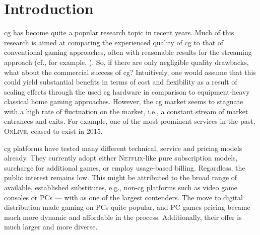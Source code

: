 
\section{Introduction}

\Gls{cg} has become quite a popular research topic in recent years.
Much of this research is aimed at comparing the experienced quality of
\gls{cg} to that of conventional gaming approaches, often with
reasonable results for the streaming approach (cf., for example,
\cite{5976180}). So, if there are only negligible quality drawbacks,
what about the commercial success of \gls{cg}? Intuitively, one
would assume that this could yield substantial benefits in terms of cost
and flexibility as a result of scaling effects through the used
\gls{cg} hardware in comparison to equipment-heavy classical home gaming
approaches. However, the \gls{cg} market seems to stagnate with a
high rate of fluctuation on the market, i.e., a constant stream of
market entrances and exits. For example, one of the most prominent
services in the past, \textsc{OnLive}, ceased to exist in 2015.




\Gls{cg} platforms have tested many different technical, service
and pricing models already. They currently adopt either
\textsc{Netflix}-like pure subscription models, surcharge for
additional games, or employ usage-based billing. Regardless, the public
interest remains low. This might be attributed to the broad range of
available, established substitutes, e.g., non-\gls{cg} platforms
such as video game consoles or PCs ---
with \steam{} as one of the
largest contenders. The move to digital distribution made gaming on PCs
quite popular, and PC games pricing became much more dynamic and
affordable in the process. Additionally, their offer is much larger
and more diverse.

